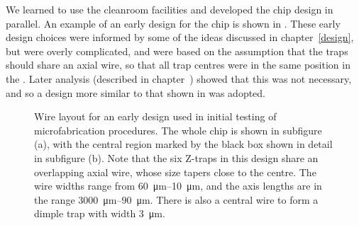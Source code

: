 We learned to use the cleanroom facilities and developed the chip design in
parallel. An example of an early design for the chip is shown in
. These early design choices were informed by
some of the ideas discussed in chapter~\ref{design}, but were overly
complicated, and were based on the assumption that the traps should share an
axial wire, so that all trap centres were in the same position in the
\xyplane{}. Later analysis (described in chapter~) showed
that this was not necessary, and so a design more similar to that shown in
 was adopted.

\begin{figure}[ht]
  \begin{subfigure}[b]{0.45\textwidth}
    \centering
    \caption{}
  \end{subfigure}
  \hspace{1cm}
  \begin{subfigure}[b]{0.45\textwidth}
    \centering
    \caption{}
  \end{subfigure}
  \caption{Wire layout for an early design used in initial testing of
  microfabrication procedures. The whole chip is shown in subfigure (a), with
  the central region marked by the black box shown in detail in subfigure (b).
  Note that the six Z-traps in this design share an overlapping axial wire,
  whose size tapers close to the centre. The wire widths range from
  \SIrange{60}{10}{\micro\meter}, and the axis lengths are in the range
  \SIrange{3000}{90}{\micro\meter}. There is also a central wire to form a
  dimple trap with width \SI{3}{\micro\meter}.
  }
  \label{fab:figs:earlydesign}
\end{figure}

